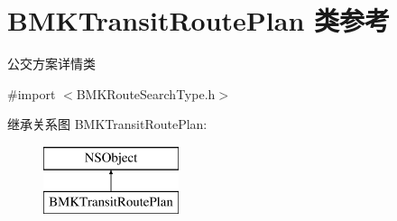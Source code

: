 \hypertarget{interface_b_m_k_transit_route_plan}{\section{B\-M\-K\-Transit\-Route\-Plan 类参考}
\label{interface_b_m_k_transit_route_plan}
}


公交方案详情类  




{\ttfamily \#import $<$B\-M\-K\-Route\-Search\-Type.\-h$>$}

继承关系图 B\-M\-K\-Transit\-Route\-Plan\-:\begin{figure}[H]
\begin{center}
\leavevmode
\includegraphics[height=2.000000cm]{interface_b_m_k_transit_route_plan}
\end{center}
\end{figure}
